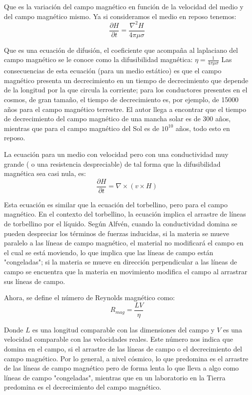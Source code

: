 Que es la variación del campo magnético en función de la velocidad del medio y del campo magnético mismo. Ya si consideramos el medio en reposo tenemos:
\begin{equation}
\frac{\partial H}{\partial t}=\frac{\nabla^{2}H}{4\pi \mu \sigma}
\end{equation}

Que es una ecuación de difusión, el coeficiente que acompaña al laplaciano del campo magnético se le conoce como la difusibilidad magnética: $\eta=\frac{1}{4\pi \mu \sigma}$
Las consecuencias de esta ecuación (para un medio estático) es que el campo magnético presenta un decrecimiento en un tiempo de decrecimiento que depende de la longitud por la que circula la corriente; para los conductores presentes en el cosmos, de gran tamaño, el tiempo de decrecimiento es, por ejemplo, de 15000 años para el campo magnético terrestre. 
El autor llega a encontrar que el tiempo de decrecimiento del campo magnético de una mancha solar es de 300 años, mientras que para el campo magnético del Sol es de $10^{10}$ años, todo esto en reposo.

La ecuación para un medio con velocidad pero con una conductividad muy grande ( o una resistencia despreciable) de tal forma que la difusibilidad magnética sea casi nula, es:
\begin{equation}
\frac{\partial H}{\partial t}=\nabla \times(v\times H)
\end{equation}

Esta ecuación es similar que la ecuación del torbellino, pero para el campo magnético. En el contexto del torbellino, la ecuación implica el arrastre de líneas de torbellino por el líquido. Según Alfvén, cuando la conductividad domina se pueden despreciar los términos de fuerzas inducidas, si la materia se mueve paralelo a las líneas de campo magnético, el material no modificará el campo en el cual se está moviendo, lo que implica que las líneas de campo están "congeladas"; si la materia se mueve en dirección perpendicular a las líneas de campo se encuentra que la materia en movimiento modifica el campo al arrastrar sus líneas de campo.

Ahora, se define el número de Reynolds magnético como:
\begin{equation}
R_{mag}=\frac{LV}{\eta}
\end{equation}

Donde $L$ es una longitud comparable con las dimensiones del campo y $V$ es una velocidad comparable con las velocidades reales. Este número nos indica que domina en el campo, si el arrastre de las líneas de campo o el decrecimiento del campo magnético. Por lo general, a nivel cósmico, lo que predomina es el arrastre de las líneas de campo magnético pero de forma lenta lo que lleva a algo como líneas de campo "congeladas", mientras que en un laboratorio en la Tierra predomina es el decrecimiento del campo magnético.

